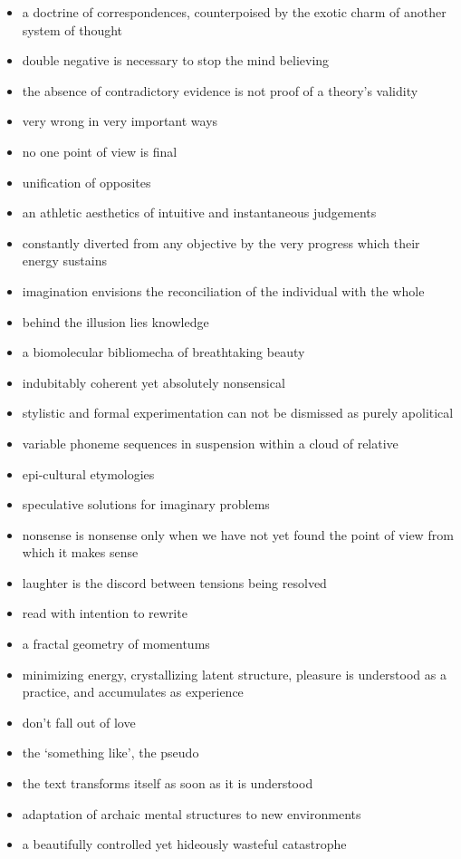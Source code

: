 \begin{itemize}
  \item a doctrine of correspondences, counterpoised by the exotic charm of another system of thought
  \item double negative is necessary to stop the mind believing
  \item the absence of contradictory evidence is not proof of a theory's validity
  \item very wrong in very important ways
  \item no one point of view is final
  \item unification of opposites
  \item an athletic aesthetics of intuitive and instantaneous judgements
  \item constantly diverted from any objective by the very progress which their energy sustains
  \item imagination envisions the reconciliation of the individual with the whole
  \item behind the illusion lies knowledge
  \item a biomolecular bibliomecha of breathtaking beauty
  \item indubitably coherent yet absolutely nonsensical
  \item stylistic and formal experimentation can not be dismissed as purely apolitical
  \item variable phoneme sequences in suspension within a cloud of relative   \item epi-cultural etymologies
  \item speculative solutions for imaginary problems
  \item nonsense is nonsense only when we have not yet found the point of view from which it makes sense
  \item laughter is the discord between tensions being resolved
  \item read with intention to rewrite
  \item a fractal geometry of momentums
  \item minimizing energy, crystallizing latent structure, pleasure is understood as a practice, and accumulates as experience
  \item don't fall out of love
  \item the `something like', the pseudo
  \item the text transforms itself as soon as it is understood
  \item adaptation of archaic mental structures to new environments
  \item a beautifully controlled yet hideously wasteful catastrophe

\end{itemize}

